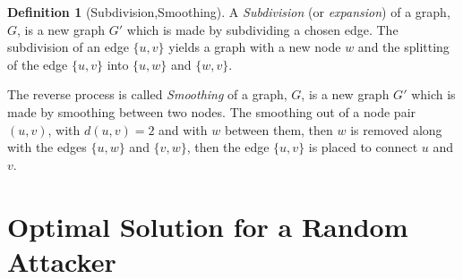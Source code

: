\documentclass[a4paper,10pt]{article}
\theoremstyle{definition}
\newtheorem{definition}[theorem]{Definition}
\theoremstyle{definition}
\theoremstyle{remark}
\theoremstyle{definition}
\begin{document}
\begin{definition}[Subdivision,Smoothing]
A \textit{Subdivision} (or \textit{expansion}) of a graph, $G$, is a new graph $G'$ which is made by subdividing a chosen edge. The subdivision of an edge $\{u,v\}$ yields a graph with a new node $w$ and the splitting of the edge $\{u,v\}$ into $\{u,w\}$ and $\{w,v\}$.

The reverse process is called \textit{Smoothing} of a graph, $G$, is a new graph $G'$ which is made by smoothing between two nodes. The smoothing out of a node pair $(u,v)$, with $d(u,v)=2$ and with $w$ between them, then $w$ is removed along with the edges $\{u,w\}$ and $\{v,w\}$, then the edge $\{u,v\}$ is placed to connect $u$ and $v$. 
\end{definition}

\begin{myfigure}
\begin{center}
\caption{Subdivision and Smoothing of the edge $\{1,2\}$}
\end{center}
\end{myfigure}

\section{Optimal Solution for a Random Attacker}
\label{Appendix:Optimal Solution for a Random Attacker}
\end{document}
